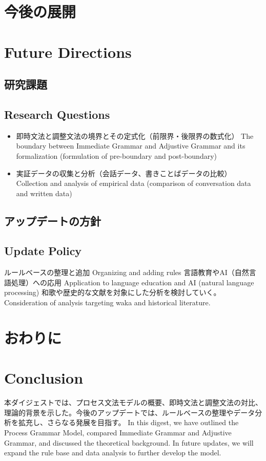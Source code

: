\documentclass[a4paper,xelatex,ja=standard]{bxjsarticle}
\begin{document}
\ifJPN
  \section{今後の展開}
\else
  \section{Future Directions}
\fi

\ifJPN
  \subsection{研究課題}
\else
  \subsection{Research Questions}
\fi

\begin{itemize}
  \item 
\ifJPN
即時文法と調整文法の境界とその定式化（前限界・後限界の数式化）
\else
The boundary between Immediate Grammar and Adjustive Grammar and its formalization (formulation of pre-boundary and post-boundary)
\fi

  \item 
\ifJPN
実証データの収集と分析（会話データ、書きことばデータの比較）
\else
Collection and analysis of empirical data (comparison of conversation data and written data)
\fi
\end{itemize}

\ifJPN
  \subsection{アップデートの方針}
\else
  \subsection{Update Policy}
\fi

\ifJPN
ルールベースの整理と追加
\else
Organizing and adding rules
\fi
\ifJPN
言語教育やAI（自然言語処理）への応用
\else
Application to language education and AI (natural language processing)
\fi
\ifJPN
和歌や歴史的な文献を対象にした分析を検討していく。
\else
Consideration of analysis targeting waka and historical literature.
\fi

\ifJPN
  \section{おわりに}
\else
  \section{Conclusion}
\fi

\ifJPN
本ダイジェストでは、プロセス文法モデルの概要、即時文法と調整文法の対比、理論的背景を示した。今後のアップデートでは、ルールベースの整理やデータ分析を拡充し、さらなる発展を目指す。
\else
In this digest, we have outlined the Process Grammar Model, compared Immediate Grammar and Adjustive Grammar, and discussed the theoretical background. In future updates, we will expand the rule base and data analysis to further develop the model.
\fi


\printbibliography
\end{document}

